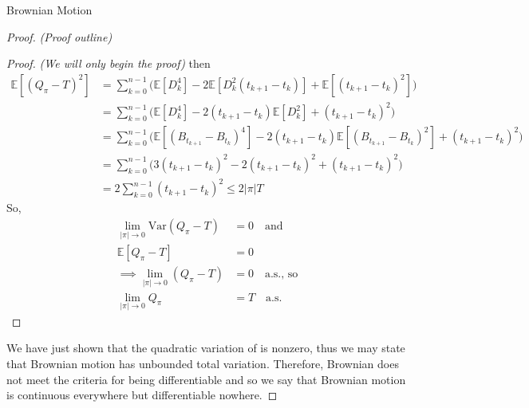 \documentclass[12pt]{article}
\newenvironment{theorem}[2][Theorem:]{\begin{trivlist} %
\item[\hskip \labelsep {\bfseries #1}\hskip \labelsep {\bfseries #2.}]}{\end{trivlist}}
\newlength\tindent
\renewcommand{\indent}{\hspace*{\tindent}}
\begin{document}
\begin{section}{Brownian Motion}
\begin{theorem}{Brownian motion is continuous everywhere but differentiable nowhere}
\begin{proof} {\em (Proof outline)}
\begin{theorem}{The quadratic variation of a Brownian motion is nonzero}
\begin{proof} {\em (We will only begin the proof)}
then
\begin{align*}
	\mathbb E[(Q_\pi - T)^2] &= \sum^{n - 1}_{k = 0} \Big( \mathbb E[D^4_k] - 2\mathbb E[D^2_k(t_{k+1} - t_k)] + \mathbb E[(t_{k+1} - t_k)^2] \Big) \\
	&=  \sum^{n - 1}_{k = 0} \Big( \mathbb E[D^4_k] - 2(t_{k+1} - t_k)\mathbb E[D^2_k] + (t_{k+1} - t_k)^2 \Big) \\
	&=  \sum^{n - 1}_{k = 0} \Big( \mathbb E[(B_{t_{k + 1}} - B_{t_k})^4] - 2(t_{k+1} - t_k)\mathbb E[(B_{t_{k + 1}} - B_{t_k})^2] + (t_{k+1} - t_k)^2 \Big) \\
	&= \sum^{n - 1}_{k = 0} \Big( 3(t_{k+1} - t_k)^2 - 2(t_{k+1} - t_k)^2 + (t_{k+1} - t_k)^2 \Big) \\ 
	&= 2\sum^{n - 1}_{k = 0}(t_{k+1} - t_k)^2 \leq 2|\pi|T
\end{align*}
So,
\begin{align*}
	\lim_{|\pi|\to0} \text{Var}(Q_\pi - T) &= 0 \quad \text{and} \\
	\mathbb E[Q_\pi - T] &= 0 \\
	\implies \lim_{|\pi|\to0} (Q_\pi - T) &= 0 \quad \text {a.s., so} \\
	\lim_{|\pi|\to0} Q_\pi &= T \quad \text{a.s.}
\end{align*}

\end{proof}
\end{theorem}

\indent We have just shown that the quadratic variation of is nonzero, thus we may state that Brownian motion has unbounded total variation. Therefore, Brownian does not meet the criteria for being differentiable and so we say that Brownian motion is continuous everywhere but differentiable nowhere.

\end{proof}
\end{theorem}

\end{section}
\end{document}
